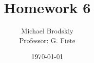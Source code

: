 


\title{Homework 6}
\date{\today}
\author{Michael Brodskiy\\ \small Professor: G. Fiete}



\maketitle

